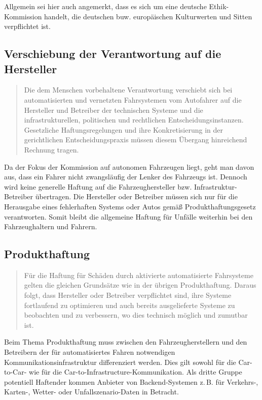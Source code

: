 \documentclass[twoside,a4paper,12pt]{article}
\begin{document}
Allgemein sei hier auch angemerkt, dass es sich um eine deutsche Ethik-Kommission handelt, die deutschen buw. europäischen Kulturwerten und Sitten verpflichtet ist. 

\subsection{Verschiebung der Verantwortung auf die Hersteller} \label{VerschiebungDerVerantwortungAufDieHersteller}

\begin{quote}
\glqq
Die dem Menschen vorbehaltene Verantwortung verschiebt sich bei automatisierten und
vernetzten Fahrsystemen vom Autofahrer auf die Hersteller und Betreiber der technischen Systeme und die infrastrukturellen, 
politischen und rechtlichen Entscheidungsinstanzen. Gesetzliche Haftungsregelungen und ihre Konkretisierung in der gerichtlichen
Entscheidungspraxis müssen diesem Übergang hinreichend Rechnung tragen.\grqq\mbox{~\cite[S. 11]{ek}}
\end{quote}

Da der Fokus der Kommission auf autonomen Fahrzeugen liegt, geht man davon aus, dass ein Fahrer nicht zwangsläufig der Lenker des Fahrzeugs ist. Dennoch wird keine
generelle Haftung auf die Fahrzeughersteller bzw. Infrastruktur-Betreiber übertragen. Die Hersteller oder Betreiber müssen sich nur für die Herausgabe eines fehlerhaften Systems oder Autos gemäß Produkthaftungsgesetz verantworten. Somit bleibt die allgemeine Haftung für Unfälle weiterhin bei den Fahrzeughaltern und Fahrern.

\subsection{Produkthaftung} \label{Produkthaftung}

\begin{quote}
\glqq
Für die Haftung für Schäden durch aktivierte automatisierte Fahrsysteme gelten die gleichen Grundsätze wie in der übrigen 
Produkthaftung. Daraus folgt, dass Hersteller oder
Betreiber verpflichtet sind, ihre Systeme fortlaufend zu optimieren und auch bereits ausgelieferte Systeme zu beobachten und zu 
verbessern, wo dies technisch möglich und zumutbar ist.\grqq\mbox{~\cite[S. 12]{ek}}
\end{quote}

Beim Thema Produkthaftung muss zwischen den Fahrzeugherstellern und den Betreibern der für automatisiertes Fahren notwendigen
Kommunikationsinfrastruktur differenziert werden. Dies gilt sowohl für die Car-to-Car- wie für die Car-to-Infrastructure-Kommunikation.
Als dritte Gruppe potentiell Haftender kommen Anbieter von Backend-Systemen z.\,B. für Verkehrs-, Karten-, Wetter- oder Unfallszena\-rio-Daten 
in Betracht. 
\end{document}
